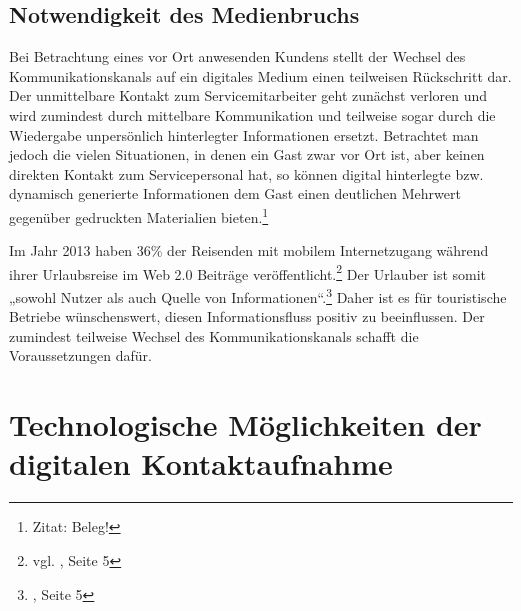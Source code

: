 \subsection{Notwendigkeit des Medienbruchs}
\label{sec:medienbruch}

Bei Betrachtung eines vor Ort anwesenden Kundens stellt der Wechsel des Kommunikationskanals auf ein digitales Medium einen teilweisen Rückschritt dar. Der unmittelbare Kontakt zum Servicemitarbeiter geht zunächst verloren und wird zumindest durch mittelbare Kommunikation und teilweise sogar durch die Wiedergabe unpersönlich hinterlegter Informationen ersetzt.
Betrachtet man jedoch die vielen Situationen, in denen ein Gast zwar vor Ort ist, aber keinen direkten Kontakt zum Servicepersonal hat, so können digital hinterlegte bzw. dynamisch generierte Informationen dem Gast einen deutlichen Mehrwert gegenüber gedruckten Materialien bieten.\footnote{Zitat: Beleg!} 

Im Jahr 2013 haben 36\% der Reisenden mit mobilem Internetzugang während ihrer Urlaubsreise im Web 2.0 Beiträge veröffentlicht.\footnote{vgl. \cite{reiseanalyse}, Seite 5} Der Urlauber ist somit „sowohl Nutzer als auch Quelle von Informationen“.\footnote{\cite{reiseanalyse}, Seite 5} Daher ist es für touristische Betriebe wünschenswert, diesen Informationsfluss positiv zu beeinflussen. Der zumindest teilweise Wechsel des Kommunikationskanals schafft die Voraussetzungen dafür.

\section{Technologische Möglichkeiten der digitalen Kontaktaufnahme}
\label{sec:technologien}

